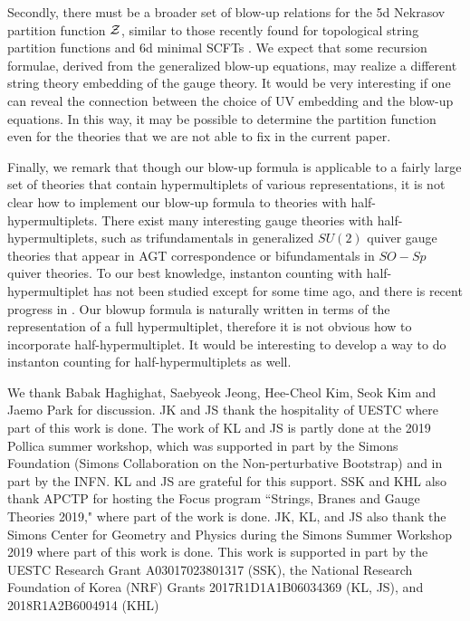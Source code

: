 \documentclass[letterpaper, 11pt]{article}
\def\CZ{{\cal Z}}
\begin{document}
{Secondly, there must be a broader set of blow-up relations for the 5d Nekrasov partition function $\CZ$, similar to those recently found for topological string partition functions and 6d minimal SCFTs \cite{Grassi:2016nnt, Gu:2017ccq, Huang:2017mis, Gu:2018gmy,Gu:2019dan}. We expect that some recursion formulae, derived from the generalized blow-up equations, may realize a different string theory embedding of the gauge theory. It would be very interesting if one can reveal the connection between the choice of UV embedding and the blow-up equations. In this way, it may be possible to determine the partition function even for the theories that we are not able to fix in the current paper. 

Finally, we remark that though our blow-up formula is applicable to a fairly large set of theories that contain hypermultiplets of various representations, it is not clear how to implement our blow-up formula to theories with half-hypermultiplets.  There exist many interesting gauge theories with half-hypermultiplets, such as trifundamentals in generalized $SU(2)$ quiver gauge theories \cite{Gaiotto:2009we} that appear in AGT correspondence \cite{Alday:2009aq} or bifundamentals in $SO-Sp$ quiver theories. To our best knowledge, instanton counting with half-hypermultiplet has not been studied except for \cite{Hollands:2010xa, Hollands:2011zc} some time ago, and there is recent progress in \cite{Coman:2019eex}. Our blowup formula is naturally written in terms of the representation of a full hypermultiplet, therefore it is not obvious how to incorporate half-hypermultiplet. It would be interesting to develop a way to do instanton counting for  half-hypermultiplets as well. 


\acknowledgments
We thank Babak Haghighat, Saebyeok Jeong, Hee-Cheol Kim, Seok Kim and Jaemo Park for discussion. 
JK and JS thank the hospitality of UESTC where part of this work is done. 
The work of KL and JS is partly done at the 2019 Pollica summer workshop, which was supported in part by the Simons Foundation (Simons Collaboration on the Non-perturbative Bootstrap) and in part by the INFN. KL and JS are grateful for this support.
SSK and KHL also thank APCTP for hosting the Focus program ``Strings, Branes and Gauge Theories 2019," where part of the work is done.
JK, KL, and JS also thank the Simons Center for Geometry and Physics during the Simons Summer Workshop 2019 where part of this work is done. 
This work is supported in part by the UESTC Research Grant A03017023801317 (SSK), the National Research Foundation of Korea (NRF) Grants 2017R1D1A1B06034369 (KL, JS), and 2018R1A2B6004914 (KHL)

}
\end{document}

